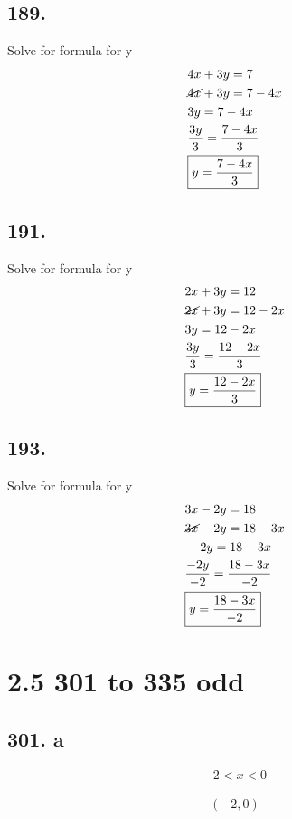 \documentclass{article}
\begin{document}
    \subsection*{189.}
    Solve for formula for y
    \begin{align*}
        &  4x + 3y = 7\\
        &  \cancel{4x}  + 3y = 7 - 4x \\
        & 3y = 7 - 4x \\
        & \frac{3y}{3} = \frac{7 - 4x}{3} \\
        & \boxed{y =  \frac{7 - 4x}{3} }
    \end{align*}

    \subsection*{191.}
    Solve for formula for y
    \begin{align*}
        &  2x + 3y = 12\\
        &  \cancel{2x} + 3y = 12 - 2x \\
        & 3y = 12 - 2x \\
        & \frac{3y}{3} = \frac{12 - 2x}{3} \\
        & \boxed{y =  \frac{12 - 2x}{3} }
    \end{align*}

    \subsection*{193.}
    Solve for formula for y
    \begin{align*}
        &  3x - 2y = 18\\
        &  \cancel{3x} - 2y = 18 - 3x \\
        & -2y = 18 - 3x \\
        & \frac{-2y}{-2} = \frac{18 - 3x}{-2} \\
        & \boxed{y =  \frac{18 - 3x}{-2} }
    \end{align*}

    \section*{2.5 301 to 335 odd}
    \subsection*{301. a}
    \begin{align*}
        -2 < x < 0
    \end{align*}
    \begin{align*}
        \boxed{(-2, 0)}
    \end{align*}
\end{document}
